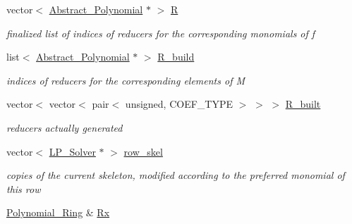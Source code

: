 \begin{DoxyCompactItemize}
vector$<$ \hyperlink{group__polygroup_class_abstract___polynomial}{Abstract\+\_\+\+Polynomial} $\ast$ $>$ \hyperlink{group___g_b_computation_a90488d65365fd6a5512ccda45780acc5}{R}
\begin{DoxyCompactList}\small\item\em finalized list of indices of reducers for the corresponding monomials of {\ttfamily f} \end{DoxyCompactList}\item 
\mbox{\label{group___g_b_computation_a03bda496da1d09c73151ba42b6db7bc4}} 
list$<$ \hyperlink{group__polygroup_class_abstract___polynomial}{Abstract\+\_\+\+Polynomial} $\ast$ $>$ \hyperlink{group___g_b_computation_a03bda496da1d09c73151ba42b6db7bc4}{R\+\_\+build}
\begin{DoxyCompactList}\small\item\em indices of reducers for the corresponding elements of {\ttfamily M} \end{DoxyCompactList}\item 
\mbox{\label{group___g_b_computation_a341e74dadaec6a56cd944f17be9b9320}} 
vector$<$ vector$<$ pair$<$ unsigned, C\+O\+E\+F\+\_\+\+T\+Y\+PE $>$ $>$ $>$ \hyperlink{group___g_b_computation_a341e74dadaec6a56cd944f17be9b9320}{R\+\_\+built}
\begin{DoxyCompactList}\small\item\em reducers actually generated \end{DoxyCompactList}\item 
\mbox{\label{group___g_b_computation_a9e8822d7ececb2271ebbef4ec62f986e}} 
vector$<$ \hyperlink{group___c_l_s_solvers_class_l_p___solvers_1_1_l_p___solver}{L\+P\+\_\+\+Solver} $\ast$ $>$ \hyperlink{group___g_b_computation_a9e8822d7ececb2271ebbef4ec62f986e}{row\+\_\+skel}
\begin{DoxyCompactList}\small\item\em copies of the current skeleton, modified according to the preferred monomial of this row \end{DoxyCompactList}\item 
\mbox{\label{group___g_b_computation_a4a1dcdff469ec1061109dc33aaceb011}} 
\hyperlink{group__polygroup_class_polynomial___ring}{Polynomial\+\_\+\+Ring} \& \hyperlink{group___g_b_computation_a4a1dcdff469ec1061109dc33aaceb011}{Rx}

\end{DoxyCompactItemize}
